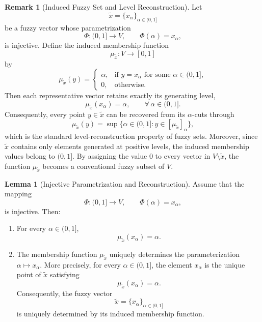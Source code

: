 \documentclass[preprint,12pt]{elsarticle}
\theoremstyle{definition}
\newtheorem{remark}{Remark}[section]
\newtheorem{lemma}{Lemma}[section]
\begin{document}
\begin{remark}[Induced Fuzzy Set and Level Reconstruction]	\label{prop:Fuzzysetinducedfuzzyvectorxxxxx}
	Let
	\[
	\widetilde{x}=\{x_\alpha\}_{\alpha\in(0,1]}
	\]
	be a fuzzy vector whose parametrization
	\[
	\Phi:(0,1]\to V,\qquad
	\Phi(\alpha)=x_\alpha,
	\]
	is injective. Define the induced membership function
	\[
	\mu_{\widetilde{x}}:V\to[0,1]
	\]
	by
	\[
	\mu_{\widetilde{x}}(y)=
	\begin{cases}
		\alpha, & \text{if } y=x_\alpha \text{ for some }\alpha\in(0,1],\\
		0, & \text{otherwise}.
	\end{cases}
	\]
	Then each representative vector retains exactly its generating level,
	\[
	\mu_{\widetilde{x}}(x_\alpha)=\alpha,
	\qquad
	\forall\,\alpha\in(0,1].
	\]
	Consequently, every point $y\in\widetilde{x}$ can be recovered from its
	$\alpha$-cuts through
	\[
	\mu_{\widetilde{x}}(y)
	=
	\sup\{\alpha\in(0,1]:
	y\in[\mu_{\widetilde{x}}]_\alpha\},
	\]
	which is the standard level-reconstruction property of fuzzy sets.
	Moreover, since $\widetilde{x}$ contains only elements generated at positive
	levels, the induced membership values belong to $(0,1]$. By assigning the
	value $0$ to every vector in $V\setminus\widetilde{x}$, the function
	$\mu_{\widetilde{x}}$ becomes a conventional fuzzy subset of $V$.
\end{remark}

 \begin{lemma}[Injective Parametrization and Reconstruction]\label{lem:InjectiveRepresentation}
 Assume that the mapping
 	\[
 	\Phi:(0,1]\to V,
 	\qquad
 	\Phi(\alpha)=x_\alpha,
 	\]
 	is injective.
 	Then:
 	
 	\begin{enumerate}
 		
 		\item
 		For every \(\alpha\in(0,1]\),
 		\[
 		\mu_{\widetilde{x}}(x_\alpha)=\alpha.
 		\]
 		
 		\item
 		The membership function \(\mu_{\widetilde{x}}\) uniquely determines the
 		parameterization \(\alpha\mapsto x_\alpha\). More precisely, for every
 		\(\alpha\in(0,1]\), the element \(x_\alpha\) is the unique point of
 		\(\widetilde{x}\) satisfying
 		\[
 		\mu_{\widetilde{x}}(x_\alpha)=\alpha.
 		\]
 		Consequently, the fuzzy vector
 		\[
 		\widetilde{x}
 		=
 		\{x_\alpha\}_{\alpha\in(0,1]}
 		\]is uniquely determined by its induced membership function.
 		
 	\end{enumerate}
 	
 \end{lemma}
 
\end{document}
